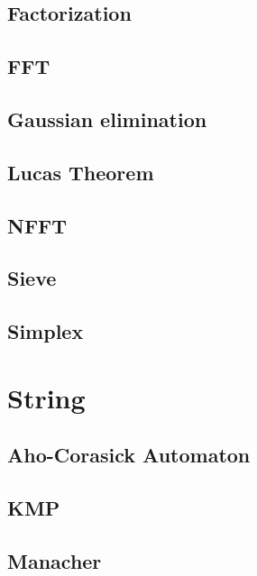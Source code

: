 \subsection{Factorization}
\raggedbottom
\subsection{FFT}
\raggedbottom
\subsection{Gaussian elimination}
\raggedbottom
\subsection{Lucas Theorem}
\raggedbottom
\subsection{NFFT}
\raggedbottom
\subsection{Sieve}
\raggedbottom
\subsection{Simplex}
\raggedbottom

\hrulefill

\section{String}
\subsection{Aho-Corasick Automaton}
\raggedbottom
\subsection{KMP}
\raggedbottom
\subsection{Manacher}
\raggedbottom
